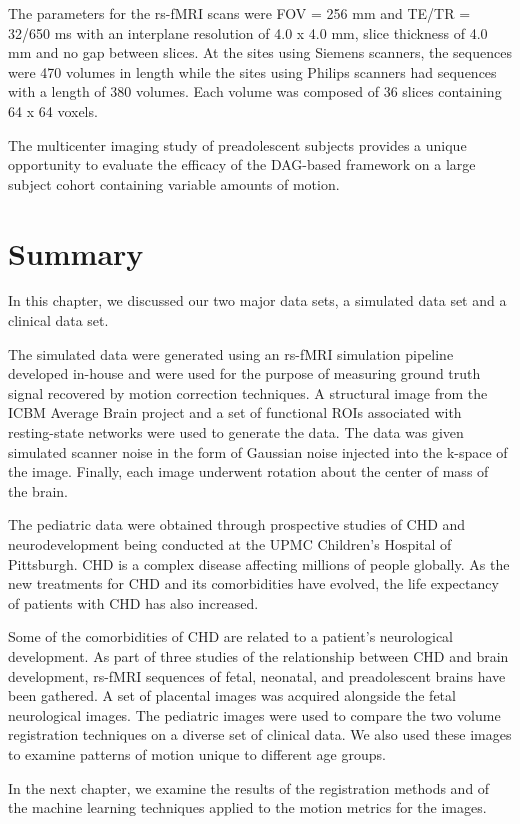 The parameters for the rs-fMRI scans were FOV = 256 mm and TE/TR = 32/650 ms with an interplane resolution of 4.0 x 4.0 mm, slice thickness of 4.0 mm and no gap between slices. At the sites using Siemens scanners, the sequences were 470 volumes in length while the sites using Philips scanners had sequences with a length of 380 volumes. Each volume was composed of 36 slices containing 64 x 64 voxels.

The multicenter imaging study of preadolescent subjects provides a unique opportunity to evaluate the efficacy of the DAG-based framework on a large subject cohort containing variable amounts of motion. %

\section{Summary}

In this chapter, we discussed our two major data sets, a simulated data set and a clinical data set. 

The simulated data were generated using an rs-fMRI simulation pipeline developed in-house and were used for the purpose of measuring ground truth signal recovered by motion correction techniques. A structural image from the ICBM Average Brain project and a set of functional ROIs associated with resting-state networks were used to generate the data. The data was given simulated scanner noise in the form of Gaussian noise injected into the k-space of the image. Finally, each image underwent rotation about the center of mass of the brain.

The pediatric data were obtained through prospective studies of CHD and neurodevelopment being conducted at the UPMC Children's Hospital of Pittsburgh. CHD is a complex disease affecting millions of people globally. As the new treatments for CHD and its comorbidities have evolved, the life expectancy of patients with CHD has also increased. 

Some of the comorbidities of CHD are related to a patient's neurological development. As part of three studies of the relationship between CHD and brain development, rs-fMRI sequences of fetal, neonatal, and preadolescent brains have been gathered. A set of placental images was acquired alongside the fetal neurological images. The pediatric images were used to compare the two volume registration techniques on a diverse set of clinical data. We also used these images to examine patterns of motion unique to different age groups. 


In the next chapter, we examine the results of the registration methods and of the machine learning techniques applied to the motion metrics for the images.
